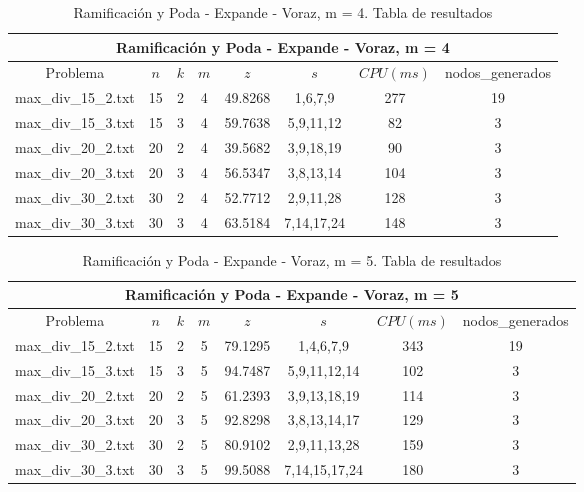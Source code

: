    \begin{table}[h]
   {\small
   \begin{center}
   \begin{tabular}{cccccccc}
      \multicolumn{8}{c}{Ramificación y Poda - Expande - Voraz, m = 4} \\
      \hline
      Problema & $n$ & $k$ & $m$ & $z$ & $s$ & $CPU(ms)$ & nodos\_generados \\
      \hline
      max\_div\_15\_2.txt & 15 & 2 & 4 & 49.8268 & 1,6,7,9 & 277 & 19 \\
      max\_div\_15\_3.txt & 15 & 3 & 4 & 59.7638 & 5,9,11,12 & 82 & 3 \\
      max\_div\_20\_2.txt & 20 & 2 & 4 & 39.5682 & 3,9,18,19 & 90 & 3 \\
      max\_div\_20\_3.txt & 20 & 3 & 4 & 56.5347 & 3,8,13,14 & 104 & 3 \\
      max\_div\_30\_2.txt & 30 & 2 & 4 & 52.7712 & 2,9,11,28 & 128 & 3 \\
      max\_div\_30\_3.txt & 30 & 3 & 4 & 63.5184 & 7,14,17,24 & 148 & 3 \\
      \hline
   \end{tabular}
   \end{center}
   }
   \caption{Ramificación y Poda - Expande - Voraz, m = 4. Tabla de resultados}
   \end{table}

   \begin{table}[h]
   {\small
   \begin{center}
   \begin{tabular}{cccccccc}
      \multicolumn{8}{c}{Ramificación y Poda - Expande - Voraz, m = 5} \\
      \hline
      Problema & $n$ & $k$ & $m$ & $z$ & $s$ & $CPU(ms)$ & nodos\_generados \\
      \hline
      max\_div\_15\_2.txt & 15 & 2 & 5 & 79.1295 & 1,4,6,7,9 & 343 & 19 \\
      max\_div\_15\_3.txt & 15 & 3 & 5 & 94.7487 & 5,9,11,12,14 & 102 & 3 \\
      max\_div\_20\_2.txt & 20 & 2 & 5 & 61.2393 & 3,9,13,18,19 & 114 & 3 \\
      max\_div\_20\_3.txt & 20 & 3 & 5 & 92.8298 & 3,8,13,14,17 & 129 & 3 \\
      max\_div\_30\_2.txt & 30 & 2 & 5 & 80.9102 & 2,9,11,13,28 & 159 & 3 \\
      max\_div\_30\_3.txt & 30 & 3 & 5 & 99.5088 & 7,14,15,17,24 & 180 & 3 \\
      \hline
   \end{tabular}
   \end{center}
   }
   \caption{Ramificación y Poda - Expande - Voraz, m = 5. Tabla de resultados}
   \end{table}

